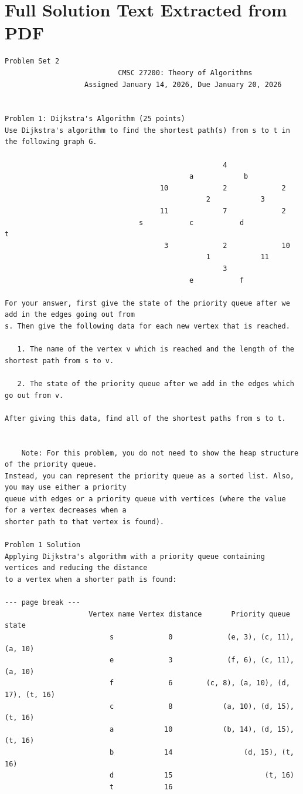 \documentclass[12pt]{article}
\begin{document}
\section*{Full Solution Text Extracted from PDF}
\begin{Verbatim}[breaklines=true,fontsize=\small]
                                      Problem Set 2
                           CMSC 27200: Theory of Algorithms
                   Assigned January 14, 2026, Due January 20, 2026


Problem 1: Dijkstra's Algorithm (25 points)
Use Dijkstra's algorithm to find the shortest path(s) from s to t in the following graph G.

                                                    4
                                            a            b
                                     10             2             2
                                                2            3
                                     11             7             2
                                s           c           d              t
                                      3             2             10
                                                1            11
                                                    3
                                            e           f

For your answer, first give the state of the priority queue after we add in the edges going out from
s. Then give the following data for each new vertex that is reached.

   1. The name of the vertex v which is reached and the length of the shortest path from s to v.

   2. The state of the priority queue after we add in the edges which go out from v.

After giving this data, find all of the shortest paths from s to t.


    Note: For this problem, you do not need to show the heap structure of the priority queue.
Instead, you can represent the priority queue as a sorted list. Also, you may use either a priority
queue with edges or a priority queue with vertices (where the value for a vertex decreases when a
shorter path to that vertex is found).

Problem 1 Solution
Applying Dijkstra's algorithm with a priority queue containing vertices and reducing the distance
to a vertex when a shorter path is found:

--- page break ---
                    Vertex name Vertex distance       Priority queue state
                         s             0             (e, 3), (c, 11), (a, 10)
                         e             3             (f, 6), (c, 11), (a, 10)
                         f             6        (c, 8), (a, 10), (d, 17), (t, 16)
                         c             8            (a, 10), (d, 15), (t, 16)
                         a            10            (b, 14), (d, 15), (t, 16)
                         b            14                 (d, 15), (t, 16)
                         d            15                      (t, 16)
                         t            16


\end{Verbatim}
\end{document}
